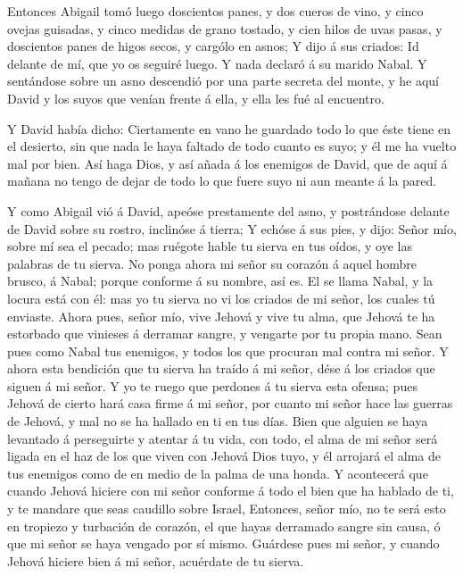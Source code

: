  Entonces Abigail tomó luego doscientos panes, y dos cueros
de vino, y cinco ovejas guisadas, y cinco medidas de grano tostado, y
cien hilos de uvas pasas, y doscientos panes de higos secos, y cargólo
en asnos;  Y dijo á sus criados: Id delante de mí, que yo
os seguiré luego. Y nada declaró á su marido Nabal.  Y
sentándose sobre un asno descendió por una parte secreta del monte, y he
aquí David y los suyos que venían frente á ella, y ella les fué al
encuentro.

 Y David había dicho: Ciertamente en vano he guardado todo
lo que éste tiene en el desierto, sin que nada le haya faltado de todo
cuanto es suyo; y él me ha vuelto mal por bien.  Así haga
Dios, y así añada á los enemigos de David, que de aquí á mañana no tengo
de dejar de todo lo que fuere suyo ni aun meante á la pared.

 Y como Abigail vió á David, apeóse prestamente del asno, y
postrándose delante de David sobre su rostro, inclinóse á tierra;
 Y echóse á sus pies, y dijo: Señor mío, sobre mí sea el
pecado; mas ruégote hable tu sierva en tus oídos, y oye las palabras de
tu sierva.  No ponga ahora mi señor su corazón á aquel
hombre brusco, á Nabal; porque conforme á su nombre, así es. El se llama
Nabal, y la locura está con él: mas yo tu sierva no vi los criados de mi
señor, los cuales tú enviaste.  Ahora pues, señor mío, vive
Jehová y vive tu alma, que Jehová te ha estorbado que vinieses á
derramar sangre, y vengarte por tu propia mano. Sean pues como Nabal tus
enemigos, y todos los que procuran mal contra mi señor.  Y
ahora esta bendición que tu sierva ha traído á mi señor, dése á los
criados que siguen á mi señor.  Y yo te ruego que perdones
á tu sierva esta ofensa; pues Jehová de cierto hará casa firme á mi
señor, por cuanto mi señor hace las guerras de Jehová, y mal no se ha
hallado en ti en tus días.  Bien que alguien se haya
levantado á perseguirte y atentar á tu vida, con todo, el alma de mi
señor será ligada en el haz de los que viven con Jehová Dios tuyo, y él
arrojará el alma de tus enemigos como de en medio de la palma de una
honda.  Y acontecerá que cuando Jehová hiciere con mi señor
conforme á todo el bien que ha hablado de ti, y te mandare que seas
caudillo sobre Israel,  Entonces, señor mío, no te será
esto en tropiezo y turbación de corazón, el que hayas derramado sangre
sin causa, ó que mi señor se haya vengado por sí mismo. Guárdese pues mi
señor, y cuando Jehová hiciere bien á mi señor, acuérdate de tu sierva.

